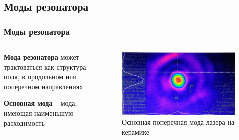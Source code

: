 \documentclass[10pt,pdf,hyperref={unicode}, dvipsnames]{beamer}
\newcommand\frametitless[1]{\subsection{#1}\frametitle{#1}}
\begin{document}
\begin{frame}[t]
	\frametitless{Моды резонатора}
	\vfill
	\begin{columns}
		\begin{column}{0.49\textwidth}
				\textbf{Мода резонатора} может трактоваться как структура поля, в продольном или поперечном направлениях
				\vspace{1em}


			\textbf{Основная мода} -- мода,
			имеющая наименьшую расходимость

		\end{column}
		\begin{column}{0.49\textwidth}
			\begin{figure}[h]
				\centering
				\includegraphics[width=\textwidth]{photo/light}
				\caption{Основная поперечная мода лазера на керамике}
			\end{figure}	
		\end{column}
	\end{columns}	
	\vfill
\end{frame}
\end{document}
